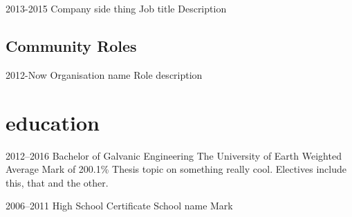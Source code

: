 \documentclass[]{friggeri-cv} %
\begin{document}
\begin{entrylist}


\entry
{2013-2015}
{Company} 
{side thing}
{Job title}
{ 
Description
}




\end{entrylist}




\subsection{Community Roles}

\begin{entrylist}


\entry
{2012-Now}
{Organisation name} 
{}
{Role}
{
description
}




\end{entrylist}


\section{education}

\begin{entrylist} 


\entry
{2012--2016}
{Bachelor {\normalfont of Galvanic Engineering}}
{The University of Earth}
{Weighted Average Mark of 200.1\%}
{
Thesis topic on something really cool. Electives include this, that and the other.
}


\entry
{2006--2011}  
{High School Certificate}
{School name}
{Mark} 
{
}


\end{entrylist}

\end{document}
